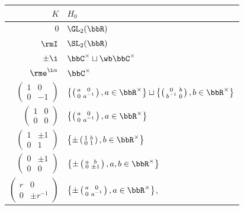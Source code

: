 \begin{center}
    \begin{tabular}{r l} 
     $K$ & $H_0$ \\ [0.5ex] 
     \hline
     $0$ & $\GL_2(\bbR)$\\
     $\rmI$ & $\SL_2(\bbR)$\\
     $\pm\i$ & $\bbC^\times\sqcup \wb\bbC^\times$\\
     $\rme^{\i\alpha}$ & $\bbC^\times$\\

     $\left(\begin{smallmatrix}
        1 & 0\\0 & -1
     \end{smallmatrix}\right)$ & $\left\{\left(\begin{smallmatrix}
        a & 0\\0 & a^{-1}
     \end{smallmatrix}\right),a\in\bbR^\times\right\}\sqcup \left\{\left(\begin{smallmatrix}
        0 & b\\b^{-1} & 0
     \end{smallmatrix}\right),b\in\bbR^\times\right\}$\\
     $\left(\begin{smallmatrix}
        1 & 0\\0 & 0
     \end{smallmatrix}\right)$ & $\left\{\left(\begin{smallmatrix}
        a & 0\\0 & a^{-1}
     \end{smallmatrix}\right),a\in\bbR^\times\right\}$\\
     $\left(\begin{smallmatrix}
        1 & \pm 1\\0 & 1
     \end{smallmatrix}\right)$ & $\left\{\pm\left(\begin{smallmatrix}
        1 & b\\0 & 1
     \end{smallmatrix}\right),b\in\bbR^\times\right\}$\\
     $\left(\begin{smallmatrix}
        0 & \pm 1\\0 & 0
     \end{smallmatrix}\right)$ & $\left\{\pm\left(\begin{smallmatrix}
        a & b\\0 & \pm 1
     \end{smallmatrix}\right),a,b\in\bbR^\times\right\}$\\
     $\left(\begin{smallmatrix}
        r & 0\\0 & \pm r^{-1}
     \end{smallmatrix}\right)$ & $\left\{\pm\left(\begin{smallmatrix}
        a & 0\\0 & a^{-1}
     \end{smallmatrix}\right),a\in\bbR^\times\right\}$,\\ [0.5ex]
     \hline
    \end{tabular}
\end{center}

